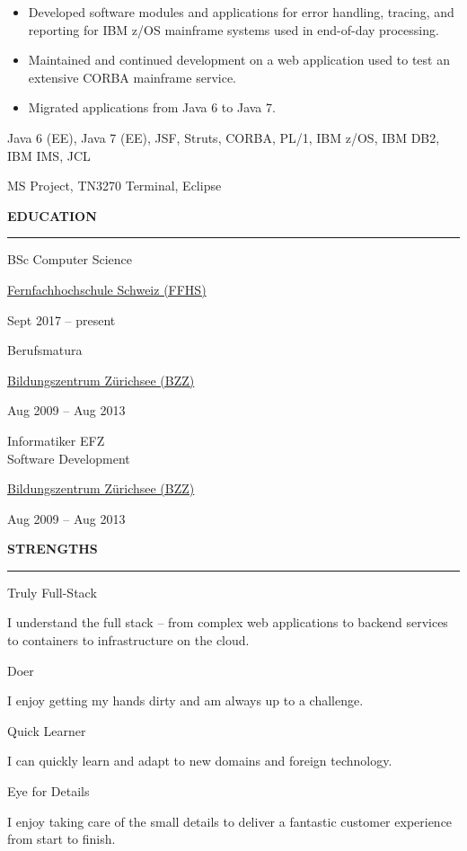 \documentclass[11pt, a4paper, ragged2e, withhyper]{altacv}
\renewcommand{\cvsectionfont}{\Large\sffamily\bfseries}
\newcommand{\cveventbreak}[4]{%
  {\Large\color{emphasis}#1\par}
  \medskip\normalsize
  \ifstrequal{#2}{}{}{
  	{#2}}\par
  \ifstrequal{#3}{}{}{{
  	{#3}}}\par
  \ifstrequal{#4}{}{}{{
  	{#4}}}\par
  \medskip\normalsize
}
\newcommand{\cvstrength}[2]{
	{\Large\color{emphasis}#1\par}
  \medskip\normalsize
  {#2}\par
}
\renewcommand{\cvsection}[2][]{%
  \bigskip%
  \ifstrequal{#1}{}{}{\marginpar{\vspace*{\dimexpr1pt-\baselineskip}\raggedright}}%
  {\color{heading}\cvsectionfont\MakeUppercase{#2}}\\%
  {\color{headingrule}\rule{\linewidth}{0.5pt}\par}\bigskip
}
\begin{document}
\begin{paracol}{2}
	\bigskip
	\begin{itemize}[label=\color{bullet}\textbullet]
		\item Developed software modules and applications for error handling, tracing, and reporting for IBM z/OS mainframe systems used in end-of-day processing.
		\item Maintained and continued development on a web application used to test an extensive CORBA mainframe service.
		\item Migrated applications from Java 6 to Java 7.
	\end{itemize}

	\bigskip
	\begin{description}
		\small
		\item [Technologies:] Java 6 (EE), Java 7 (EE), JSF, Struts, CORBA, PL/1, IBM z/OS, IBM DB2, IBM IMS, JCL
		\item [Tools:] MS Project, TN3270 Terminal, Eclipse
	\end{description}
		
	\switchcolumn
	
	\cvsection{Education}
	\cveventbreak{BSc Computer Science}{\href{https://www.ffhs.ch/}{Fernfachhochschule Schweiz (FFHS)}}{Sept 2017 -- present}{}

	\bigskip
	\cveventbreak{Berufsmatura}{\href{https://www.bzz.ch/}{Bildungszentrum Zürichsee (BZZ)}}{Aug 2009 -- Aug 2013}{}

	\bigskip
	\cveventbreak{Informatiker EFZ \\\small{Software Development}}{\href{https://www.bzz.ch/}{Bildungszentrum Zürichsee (BZZ)}}{Aug 2009 -- Aug 2013}{}

	\cvsection{Strengths}
	\cvstrength{Truly Full-Stack}{I understand the full stack -- from complex web applications to backend services to containers to infrastructure on the cloud.}

	\bigskip
	\cvstrength{Doer}{I enjoy getting my hands dirty and am always up to a challenge.}

	\bigskip
	\cvstrength{Quick Learner}{I can quickly learn and adapt to new domains and foreign technology.}
	
	\bigskip
	\cvstrength{Eye for Details}{I enjoy taking care of the small details to deliver a fantastic customer experience from start to finish.}


\end{paracol}
\end{document}
